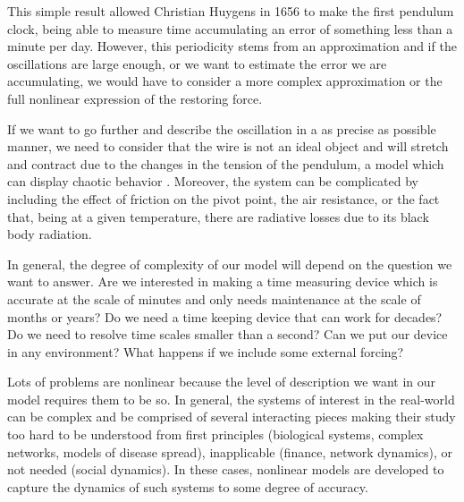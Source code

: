 This simple result allowed Christian Huygens in 1656 to make the first pendulum clock, being able to measure time  accumulating an error of something less than a minute per day. 
However, this periodicity stems from an approximation and if the oscillations are large enough, or we want to estimate the error we are accumulating, we would have to consider a more complex approximation or the full nonlinear expression of the restoring force. 


If we want to go further and  describe the oscillation in a as precise as possible manner,  we  need to  consider that the wire is not an ideal object and will stretch and contract due to the changes in the tension of the pendulum, a model which can display chaotic behavior \citep{Cencini2009}. 
Moreover, the system can be complicated by including the effect of friction on the pivot point, the air resistance, or the fact that, being at a given temperature, there are radiative losses due to its black body radiation.

In general, the degree of complexity of our model will depend on the question we want to answer. Are we interested in making a time measuring device which is accurate at the scale of minutes and only needs maintenance at the scale of months or years?  Do we need a time keeping device that can work for decades? Do we need to resolve time scales smaller than a second? Can we put our device in any environment? What happens if we include some external forcing?


	



Lots of problems are nonlinear because the level of description we want in our model requires them to be so.
In general, the systems of interest in the real-world can be complex and be comprised of several interacting pieces making their study too hard to be understood from first principles (biological systems, complex networks, models of disease spread), inapplicable (finance, network dynamics), or not needed (social dynamics). 
In these cases, nonlinear models are developed to capture the dynamics of such systems to some degree of accuracy. 


